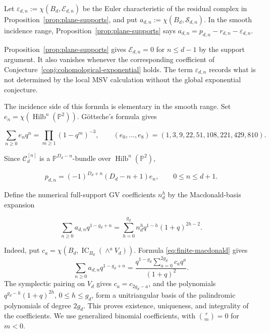 \documentclass[11pt,reqno]{amsart}
\theoremstyle{definition}
\newcommand{\Pp}{\mathbb P}
\newcommand{\IC}{\operatorname{IC}}
\newcommand{\Hilb}{\operatorname{Hilb}}
\begin{document}
Let $\varepsilon_{d,n}:=\chi(B_d,\mathcal E_{d,n})$ be the Euler
characteristic of the residual complex in
Proposition~\ref{prop:plane-supports}, and put
$a_{d,n}:=\chi(B_d,\mathcal S_{d,n})$.  In the smooth incidence range,
Proposition~\ref{prop:plane-supports} says
$a_{d,n}=p_{d,n}-r_{d,n}-\varepsilon_{d,n}$.

Proposition~\ref{prop:plane-supports} gives $\mathcal E_{d,n}=0$
for $n\le d-1$ by the support argument.  It also vanishes whenever the corresponding
coefficient of Conjecture~\ref{conj:cohomological-exponential} holds.  The
term $\varepsilon_{d,n}$ records what is not determined by the local MSV
calculation without the global exponential conjecture.

The incidence side of this formula is elementary in the smooth range.  Set
$e_n=\chi(\Hilb^n(\Pp^2))$.  G\"ottsche's formula \cite{Goettsche} gives

\begin{equation}\label{eq:goettsche-p2}
  \sum_{n\ge0}e_nq^n=\prod_{m\ge1}(1-q^m)^{-3},
  \qquad
  (e_0,\ldots,e_8)=(1,3,9,22,51,108,221,429,810).
\end{equation}

Since $\mathcal C_d^{[n]}$ is a $\Pp^{D_d-n}$-bundle over
$\Hilb^n(\Pp^2)$,

\begin{equation}\label{eq:incidence-general}
  p_{d,n}=(-1)^{D_d+n}(D_d-n+1)e_n,
  \qquad 0\le n\le d+1.
\end{equation}

Define the numerical full-support GV coefficients $n_d^h$ by the
Macdonald-basis expansion

\begin{equation}\label{eq:kkv-basis-series}
  \sum_{n\ge0}a_{d,n}q^{1-g_d+n}
  =
  \sum_{h=0}^{g_d}n_d^h q^{1-h}(1+q)^{2h-2}.
\end{equation}

Indeed, put
$c_a=\chi(B_d,\IC_{B_d}(\wedge^aV_d))$.  Formula
\eqref{eq:finite-macdonald} gives
\[
 \sum_{n\ge0}a_{d,n}q^{1-g_d+n}
 =\frac{q^{1-g_d}\sum_{a=0}^{2g_d}c_aq^a}{(1+q)^2}.
\]
The symplectic pairing on $V_d$ gives $c_a=c_{2g_d-a}$, and the polynomials
$q^{g_d-h}(1+q)^{2h}$, $0\le h\le g_d$, form a unitriangular basis of the
palindromic polynomials of degree $2g_d$.  This proves existence, uniqueness,
and integrality of the coefficients.  We use generalized binomial
coefficients, with $\binom rm=0$ for $m<0$.
\end{document}
